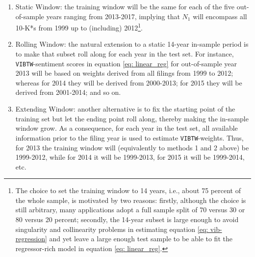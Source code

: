 \begin{enumerate}
\item Static Window: the training window will be the same for each of the five out-of-sample years ranging from 2013-2017, implying that $N_1$ will encompass all 10-K*s from 1999 up to (including) 2012\footnote{The choice to set the training window to 14 years, i.e., about 75 percent of the whole sample, is motivated by two reasons: firstly, although the choice is still arbitrary, many applications adopt a full sample split of 70 versus 30 or 80 versus 20 percent; secondly, the 14-year subset is large enough to avoid singularity and collinearity problems in estimating equation \eqref{eq: vib-regression} and yet leave a large enough test sample to be able to fit the regressor-rich model in equation \eqref{eq: linear_reg}.}.
\item Rolling Window: the natural extension to a static 14-year in-sample period is to make that subset roll along for each year in the test set. For instance, \texttt{VIBTW}-sentiment scores in equation \eqref{eq: linear_reg} for out-of-sample year 2013 will be based on weights derived from all filings from 1999 to 2012; whereas for 2014 they will be derived from 2000-2013; for 2015 they will be derived from 2001-2014; and so on. 
\item Extending Window: another alternative is to fix the starting point of the training set but let the ending point roll along, thereby making the in-sample window grow. As a consequence, for each year in the test set, all available information prior to the filing year is used to estimate \texttt{VIBTW}-weights. Thus, for 2013 the training window will (equivalently to methods 1 and 2 above) be 1999-2012, while for 2014 it will be 1999-2013, for 2015 it will be 1999-2014, etc. 
\end{enumerate}

\clearpage